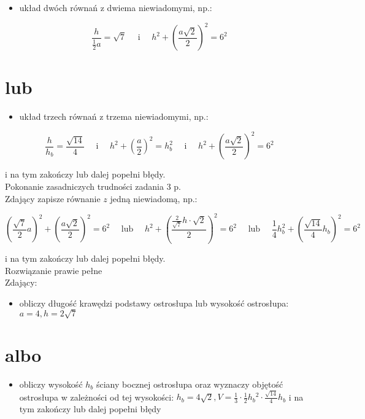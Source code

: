 \documentclass[10pt]{article}
\begin{document}
\begin{itemize}
  \item układ dwóch równań z dwiema niewiadomymi, np.:
\end{itemize}

$$
\frac{h}{\frac{1}{2} a}=\sqrt{7} \quad \text { i } \quad h^{2}+\left(\frac{a \sqrt{2}}{2}\right)^{2}=6^{2}
$$

\section*{lub}
\begin{itemize}
  \item układ trzech równań z trzema niewiadomymi, np.:
\end{itemize}

$$
\frac{h}{h_{b}}=\frac{\sqrt{14}}{4} \quad \text { i } \quad h^{2}+\left(\frac{a}{2}\right)^{2}=h_{b}^{2} \quad \text { i } \quad h^{2}+\left(\frac{a \sqrt{2}}{2}\right)^{2}=6^{2}
$$

i na tym zakończy lub dalej popełni błędy.\\
Pokonanie zasadniczych trudności zadania 3 p.\\
Zdający zapisze równanie $z$ jedną niewiadomą, np.:

$$
\left(\frac{\sqrt{7}}{2} a\right)^{2}+\left(\frac{a \sqrt{2}}{2}\right)^{2}=6^{2} \quad \text { lub } \quad h^{2}+\left(\frac{\frac{2}{\sqrt{7}} h \cdot \sqrt{2}}{2}\right)^{2}=6^{2} \quad \text { lub } \quad \frac{1}{4} h_{b}^{2}+\left(\frac{\sqrt{14}}{4} h_{b}\right)^{2}=6^{2}
$$

i na tym zakończy lub dalej popełni błędy.\\
Rozwiązanie prawie pełne\\
Zdający:

\begin{itemize}
  \item obliczy długość krawędzi podstawy ostrosłupa lub wysokość ostrosłupa: $a=4, h=2 \sqrt{7}$
\end{itemize}

\section*{albo}
\begin{itemize}
  \item obliczy wysokość $h_{b}$ ściany bocznej ostrosłupa oraz wyznaczy objętość ostrosłupa w zależności od tej wysokości: $h_{b}=4 \sqrt{2}, V=\frac{1}{3} \cdot \frac{1}{2} h_{b}{ }^{2} \cdot \frac{\sqrt{14}}{4} h_{b}$ i na tym zakończy lub dalej popełni błędy
\end{itemize}
\end{document}
